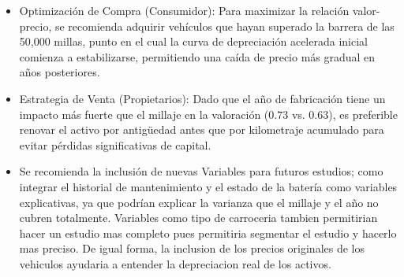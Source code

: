 \documentclass[oneside,11pt]{Latex/Classes/PhDthesisPSnPDF}
\begin{document}
\begin{itemize}

\item Optimización de Compra (Consumidor): Para maximizar la relación valor-precio, se recomienda adquirir vehículos que hayan superado la barrera de las 50,000 millas, punto en el cual la curva de depreciación acelerada inicial comienza a estabilizarse, permitiendo una caída de precio más gradual en años posteriores.

\item Estrategia de Venta (Propietarios): Dado que el año de fabricación tiene un impacto más fuerte que el millaje en la valoración ($0.73$ vs. $0.63$), es preferible renovar el activo por antigüedad antes que por kilometraje acumulado para evitar pérdidas significativas de capital.

\item  Se recomienda la inclusión de nuevas Variables para futuros estudios; como integrar el historial de mantenimiento y el estado de la batería como variables explicativas, ya que podrían explicar la varianza que el millaje y el año no cubren totalmente. Variables como tipo de carroceria tambien permitirian hacer un estudio mas completo pues permitiria segmentar el estudio y hacerlo mas preciso. De igual forma, la inclusion de los precios originales de los vehiculos ayudaria a entender la depreciacion real de los activos.
\end{itemize}

\renewcommand{\bibname}{Lista de Referencias}
 
 

\end{document}
